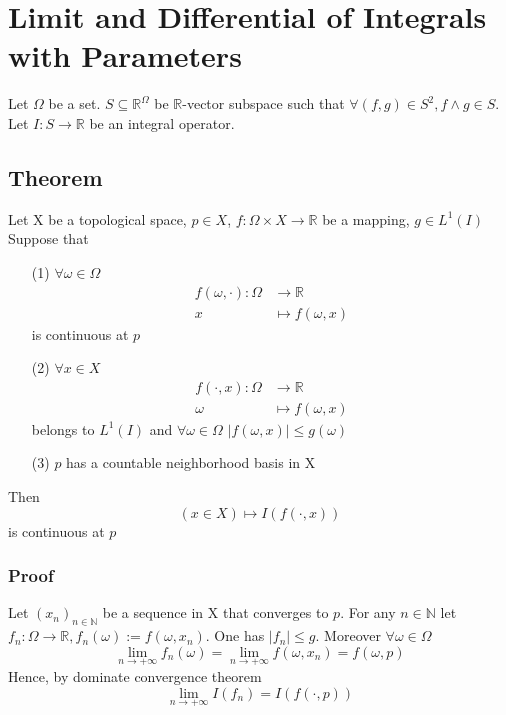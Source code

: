 \documentclass{book}
\newcommand{\abs}[1]{\left\lvert #1 \right\rvert}
\begin{document}
\chapter{Limit and Differential of Integrals with Parameters}
Let $\Omega$ be a set. $S\subseteq\mathbb{R}^\Omega$ be $\mathbb{R}$-vector subspace such that $\forall(f,g)\in S^2,f\wedge g\in S$. Let $I:S\rightarrow \mathbb{R}$ be an integral operator.
\section{Theorem}
Let X be a topological space, $p\in X$, $f:\Omega\times X\rightarrow\mathbb{R}$ be a mapping, $g\in L^1(I)$ Suppose that
\begin{itemize}
    \item [(1)]$\forall \omega\in \Omega$ 
    $$\begin{aligned}
        f(\omega,\cdot):\Omega &\rightarrow\mathbb{R}\\ x &\mapsto f(\omega,x)
    \end{aligned}$$ is continuous at $p$
    \item[(2)] $\forall x\in X$
    $$\begin{aligned}
        f(\cdot,x):\Omega &\rightarrow\mathbb{R}\\ \omega &\mapsto f(\omega,x)
    \end{aligned}$$ belongs to $L^1(I)$ and $\forall \omega\in \Omega$ $\abs{f(\omega,x)}\leq g(\omega)$
    \item [(3)] $p$ has a countable neighborhood basis in X
\end{itemize}
Then $$(x\in X)\mapsto I(f(\cdot,x))$$ is continuous at $p$
\subsection*{Proof}
Let $(x_n)_{n\in \mathbb{N}}$ be a sequence in X that converges to $p$. For any $n\in \mathbb{N}$ let $f_n:\Omega\rightarrow\mathbb{R},f_n(\omega):=f(\omega,x_n)$. One has $\abs{f_n}\leq g$. Moreover $\forall \omega\in \Omega$ $$\lim\limits_{n\rightarrow+\infty}f_n(\omega)=\lim\limits_{n\rightarrow+\infty}f(\omega,x_n)=f(\omega,p)$$
Hence, by dominate convergence theorem$$\lim\limits_{n\rightarrow+\infty}I(f_n)=I(f(\cdot,p))$$
\end{document}
